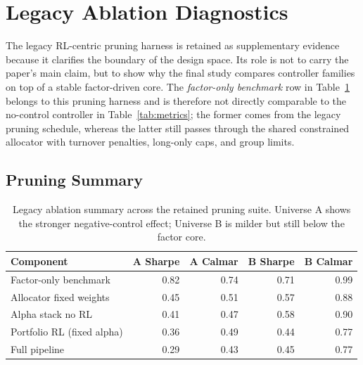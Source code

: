 \documentclass[10pt,twocolumn]{article}
\begin{document}
\section{Legacy Ablation Diagnostics}
\label{sec:legacy_appendix}

The legacy RL-centric pruning harness is retained as supplementary evidence
because it clarifies the boundary of the design space. Its role is not to carry
the paper's main claim, but to show why the final study compares controller
families on top of a stable factor-driven core. The \emph{factor-only
benchmark} row in Table~\ref{tab:ablation_summary} belongs to this pruning
harness and is therefore not directly comparable to the no-control controller
in Table~\ref{tab:metrics}; the former comes from the legacy pruning schedule,
whereas the latter still passes through the shared constrained allocator with
turnover penalties, long-only caps, and group limits.

\subsection{Pruning Summary}

\begin{table}[t]
\centering
\caption{Legacy ablation summary across the retained pruning suite. Universe A
shows the stronger negative-control effect; Universe B is milder but still
below the factor core.}
\label{tab:ablation_summary}
\begingroup\small
\begin{tabular}{@{} l r r r r @{}}
\toprule
\textbf{Component} & \textbf{A Sharpe} & \textbf{A Calmar} & \textbf{B Sharpe} & \textbf{B Calmar} \\
\midrule
Factor-only benchmark       & 0.82 & 0.74 & 0.71 & 0.99 \\
Allocator fixed weights     & 0.45 & 0.51 & 0.57 & 0.88 \\
Alpha stack no RL           & 0.41 & 0.47 & 0.58 & 0.90 \\
Portfolio RL (fixed alpha)  & 0.36 & 0.49 & 0.44 & 0.77 \\
Full pipeline               & 0.29 & 0.43 & 0.45 & 0.77 \\
\bottomrule
\end{tabular}
\endgroup
\end{table}
\end{document}
